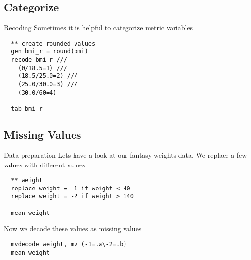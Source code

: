 \subsection{Categorize} 
\begin{frame}[fragile]{Recoding}   
Sometimes it is helpful to categorize metric variables
\begin{lstlisting}
  ** create rounded values
  gen bmi_r = round(bmi)
  recode bmi_r ///
    (0/18.5=1) ///
    (18.5/25.0=2) ///
    (25.0/30.0=3) ///
    (30.0/60=4)
    
  tab bmi_r
\end{lstlisting}

\end{frame}

\subsection{Missing Values}
\begin{frame}[fragile]{Data preparation}   
Lets have a look at our fantasy weights data. We replace a few values with different values
\begin{lstlisting}  
  ** weight
  replace weight = -1 if weight < 40
  replace weight = -2 if weight > 140
  
  mean weight  
\end{lstlisting}
Now we decode these values as missing values
\begin{lstlisting}
  mvdecode weight, mv (-1=.a\-2=.b)
  mean weight
\end{lstlisting}


\end{frame}

